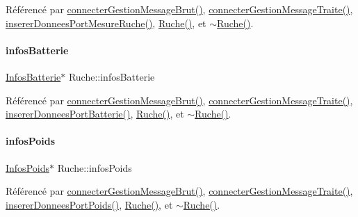 Référencé par \hyperlink{class_ruche_a9c8e7e3b529676c6dda3d936370af00f}{connecter\+Gestion\+Message\+Brut()}, \hyperlink{class_ruche_a20ec8c6dc931218e5cf682050fe845d9}{connecter\+Gestion\+Message\+Traite()}, \hyperlink{class_ruche_aa61f6dd8b15e5242ef3a3bdd87cca4a3}{inserer\+Donnees\+Port\+Mesure\+Ruche()}, \hyperlink{class_ruche_a8b4ee3752d984c5acee93b990db7939a}{Ruche()}, et \hyperlink{class_ruche_ad3f950d0731f9801f06dd6ae09f2e5fa}{$\sim$\+Ruche()}.

\mbox{\label{class_ruche_af34340e456aff54c8d1ec433fdbe0740}} 
\paragraph{\texorpdfstring{infos\+Batterie}{infosBatterie}}
{\footnotesize\ttfamily \hyperlink{class_infos_batterie}{Infos\+Batterie}$\ast$ Ruche\+::infos\+Batterie\hspace{0.3cm}{\ttfamily [private]}}



Référencé par \hyperlink{class_ruche_a9c8e7e3b529676c6dda3d936370af00f}{connecter\+Gestion\+Message\+Brut()}, \hyperlink{class_ruche_a20ec8c6dc931218e5cf682050fe845d9}{connecter\+Gestion\+Message\+Traite()}, \hyperlink{class_ruche_a509367d6b2bcb7e6431fc1cc5ff606b5}{inserer\+Donnees\+Port\+Batterie()}, \hyperlink{class_ruche_a8b4ee3752d984c5acee93b990db7939a}{Ruche()}, et \hyperlink{class_ruche_ad3f950d0731f9801f06dd6ae09f2e5fa}{$\sim$\+Ruche()}.

\mbox{\label{class_ruche_af3d02b62dd3d986b73b38851bb88ec77}} 
\paragraph{\texorpdfstring{infos\+Poids}{infosPoids}}
{\footnotesize\ttfamily \hyperlink{class_infos_poids}{Infos\+Poids}$\ast$ Ruche\+::infos\+Poids\hspace{0.3cm}{\ttfamily [private]}}



Référencé par \hyperlink{class_ruche_a9c8e7e3b529676c6dda3d936370af00f}{connecter\+Gestion\+Message\+Brut()}, \hyperlink{class_ruche_a20ec8c6dc931218e5cf682050fe845d9}{connecter\+Gestion\+Message\+Traite()}, \hyperlink{class_ruche_a923f42fc4878a01f6102966a748e8f37}{inserer\+Donnees\+Port\+Poids()}, \hyperlink{class_ruche_a8b4ee3752d984c5acee93b990db7939a}{Ruche()}, et \hyperlink{class_ruche_ad3f950d0731f9801f06dd6ae09f2e5fa}{$\sim$\+Ruche()}.

